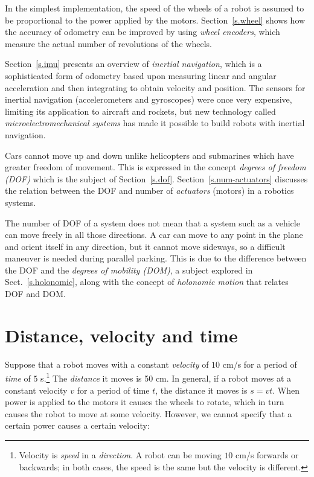 In the simplest implementation, the speed of the wheels of a robot is assumed to be proportional to the power applied by the motors. Section~\ref{s.wheel} shows how the accuracy of odometry can be improved by using \emph{wheel encoders}, which measure the actual number of revolutions of the wheels.

Section~\ref{s.imu} presents an overview of \emph{inertial navigation}, which is a sophisticated form of odometry based upon measuring linear and angular acceleration and then integrating to obtain velocity and position. The sensors for inertial navigation (accelerometers and gyroscopes) were once very expensive, limiting its application to aircraft and rockets, but new technology called \emph{microelectromechanical systems} has made it possible to build robots with inertial navigation.

Cars cannot move up and down unlike helicopters and submarines which have greater freedom of movement. This is expressed in the concept \emph{degrees of freedom (DOF)} which is the subject of Section~\ref{s.dof}. Section~\ref{s.num-actuators} discusses the relation between the DOF and number of \emph{actuators} (motors) in a robotics systems.

The number of DOF of a system does not mean that a system such as a vehicle can move freely in all those directions. A car can move to any point in the plane and orient itself in any direction, but it cannot move sideways, so a difficult maneuver is needed during parallel parking. This is due to the difference between the DOF and the \emph{degrees of mobility (DOM)}, a subject explored in Sect.~\ref{s.holonomic}, along with the concept of \emph{holonomic motion} that relates DOF and DOM.

\section{Distance, velocity and time}\label{s.distance-velocity}

Suppose that a robot moves with a constant \emph{velocity} of $10$ cm/s for a period of \emph{time} of $5$ s.\footnote{Velocity is \emph{speed} in a \emph{direction}. A robot can be moving $10$ cm/s forwards or backwards; in both cases, the speed is the same but the velocity is different.} The \emph{distance} it moves is 50 cm. In general, if a robot moves at a constant velocity $v$ for a period of time $t$, the distance it moves is $s=vt$. When power is applied to the motors it causes the wheels to rotate, which in turn causes the robot to move at some velocity. However, we cannot specify that a certain power causes a certain velocity:

